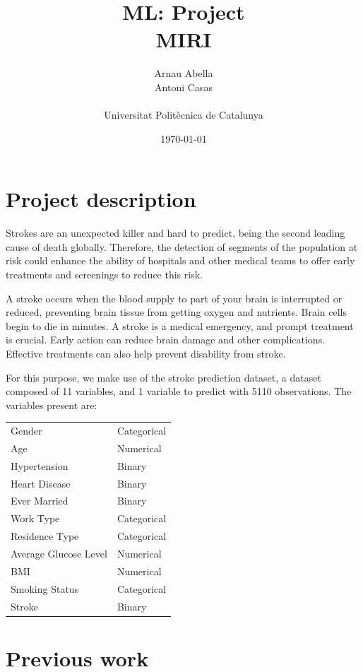 \documentclass[11pt, a4paper]{article}
\title{%
  \vspace{-10ex}
  ML: Project \\
  \large{MIRI}
}
\author{%
  Arnau Abella \\
  Antoni Casas \\
  \\
  \large{Universitat Polit\`ecnica de Catalunya}
}
\date{\today}
\begin{document}
\maketitle

\section{Project description}

Strokes are an unexpected killer and hard to predict, being the second leading cause of death globally. Therefore, the detection of segments of the population at risk could enhance the ability of hospitals and other medical teams to offer early treatments and screenings to reduce this risk.

A stroke occurs when the blood supply to part of your brain is interrupted or reduced, preventing brain tissue from getting oxygen and nutrients. Brain cells begin to die in minutes. A stroke is a medical emergency, and prompt treatment is crucial. Early action can reduce brain damage and other complications. Effective treatments can also help prevent disability from stroke.

For this purpose, we make use of the stroke prediction dataset, a dataset composed of 11 variables, and 1 variable to predict with 5110 observations. The variables present are:

\begin{table}[H]
\begin{tabular}{ll}
Gender                & Categorical \\
Age                   & Numerical   \\
Hypertension          & Binary      \\
Heart Disease         & Binary      \\
Ever Married          & Binary      \\
Work Type             & Categorical \\
Residence Type        & Categorical \\
Average Glucose Level & Numerical   \\
BMI                   & Numerical   \\
Smoking Status        & Categorical \\
Stroke                & Binary     
\end{tabular}
\end{table}

\section{Previous work}
\end{document}

